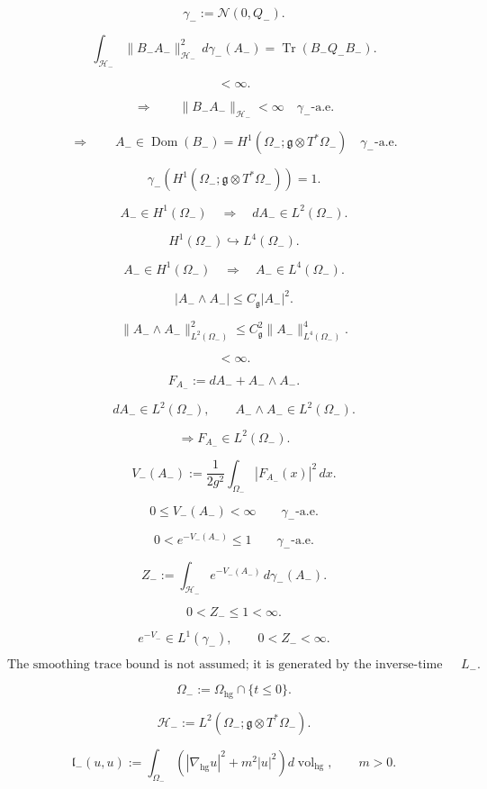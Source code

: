 \documentclass[11pt]{article}
\begin{document}
\[
\gamma_-
:=
\mathcal N(0,Q_-).
\]

\[
\int_{\mathcal H_-}
\|B_-A_-\|_{\mathcal H_-}^2
\,d\gamma_-(A_-)
=
\operatorname{Tr}(B_-Q_-B_-).
\]

\[
<\infty.
\]

\[
\Longrightarrow
\qquad
\|B_-A_-\|_{\mathcal H_-}<\infty
\quad
\gamma_-\text{-a.e.}
\]

\[
\Longrightarrow
\qquad
A_-\in\operatorname{Dom}(B_-)
=
H^1(\Omega_-;\mathfrak g\otimes T^\ast\Omega_-)
\quad
\gamma_-\text{-a.e.}
\]

\[
\boxed{
\gamma_-\!\left(
H^1(\Omega_-;\mathfrak g\otimes T^\ast\Omega_-)
\right)=1.
}
\]

\[
A_-\in H^1(\Omega_-)
\quad\Longrightarrow\quad
dA_-\in L^2(\Omega_-).
\]

\[
H^1(\Omega_-)\hookrightarrow L^4(\Omega_-).
\]

\[
A_-\in H^1(\Omega_-)
\quad\Longrightarrow\quad
A_-\in L^4(\Omega_-).
\]

\[
|A_-\wedge A_-|
\le
C_{\mathfrak g}|A_-|^2.
\]

\[
\|A_-\wedge A_-\|_{L^2(\Omega_-)}^2
\le
C_{\mathfrak g}^2
\|A_-\|_{L^4(\Omega_-)}^4.
\]

\[
<\infty.
\]

\[
F_{A_-}
:=
dA_-+A_-\wedge A_-.
\]

\[
dA_-\in L^2(\Omega_-),
\qquad
A_-\wedge A_-\in L^2(\Omega_-).
\]

\[
\Longrightarrow
F_{A_-}\in L^2(\Omega_-).
\]

\[
V_-(A_-)
:=
\frac1{2g^2}
\int_{\Omega_-}|F_{A_-}(x)|^2\,dx.
\]

\[
0\le V_-(A_-)<\infty
\qquad
\gamma_-\text{-a.e.}
\]

\[
0<e^{-V_-(A_-)}\le1
\qquad
\gamma_-\text{-a.e.}
\]

\[
Z_-:=
\int_{\mathcal H_-}
e^{-V_-(A_-)}
\,d\gamma_-(A_-).
\]

\[
0<Z_-\le1<\infty.
\]

\[
\boxed{
e^{-V_-}\in L^1(\gamma_-),
\qquad
0<Z_-<\infty.
}
\]

\[
\text{The smoothing trace bound is not assumed; it is generated by the inverse-time hourglass operator }L_-.
\]

\[
\Omega_-:=\Omega_{\mathrm{hg}}\cap\{t\le0\}.
\]

\[
\mathcal H_-:=L^2(\Omega_-;\mathfrak g\otimes T^\ast\Omega_-).
\]

\[
\mathfrak l_-(u,u)
:=
\int_{\Omega_-}
\left(
|\nabla_{\mathrm{hg}}u|^2+m^2|u|^2
\right)
d\operatorname{vol}_{\mathrm{hg}},
\qquad
m>0.
\]
\end{document}
